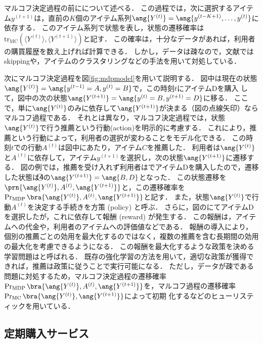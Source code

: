 マルコフ決定過程の前にについて述べる．
この過程では，次に選択するアイテム$y^{(t+1)}$は，直前の$K$個のアイテム系列$\ang{Y^{(t)}}=\ang{y^{(t-K+1)},\dotsc,y^{(t)}}$に依存する．
このアイテム系列で状態を表し，状態の遷移確率は$\mathrm{tr}_\mathrm{MC}(\langle Y^{(t)}\rangle,\langle Y^{(t+1)}\rangle)$と記す．
この確率は，十分なデータがあれば，利用者の購買履歴を数え上げれば計算できる．
しかし，データは疎なので，文献\cite{uai:02:02,jmlr:05:03}ではskippingや，アイテムのクラスタリングなどの手法を用いて対処している．

次にマルコフ決定過程を図\ref{fig:mdpmodel}を用いて説明する．
図中は現在の状態$\ang{Y^{(t)}}=\ang{y^{(t-1)}=A,y^{(t)}=B}$で，この時刻$t$にアイテムDを購入
して，図中の次の状態$\ang{Y^{(t+1)}}=\ang{y^{(t)}=B,y^{(t+1)}=D}$に移る．
ここで，単に$\ang{Y^{(t)}}$のみに依存して$\ang{Y^{(t+1)}}$が決まる（図の点線矢印）ならマルコフ過程である．
それとは異なり，マルコフ決定過程では，状態$\ang{Y^{(t)}}$で行う推薦という行動(action)を明示的に考慮する．
これにより，推薦という行動によって，利用者の選択が変わることをモデル化できる．
この時刻$t$での行動$A^{(t)}$は図中にあたり，アイテム$C$を推薦した．
利用者は$\ang{Y^{(t)}}$と$A^{(t)}$に依存して，アイテム$y^{(t+1)}$を選択し，次の状態$\ang{Y^{(t+1)}}$に遷移する．
図の例では，推薦を受け入れず利用者はでアイテムDを購入したので，遷移した状態は\textcircled{\small 4}の$\ang{Y^{(t+1)}}=\ang{B,D}$となった．
この状態遷移を$\prn{\ang{Y^{(t)}},A^{(t)},\ang{Y^{(t+1)}}}$と，この遷移確率を$\Pr_\mathrm{MDP}\bra{\ang{Y^{(t)}},A^{(t)},\ang{Y^{(t+1)}}}$と記す．
また，状態$\ang{Y^{(t)}}$で行動$A^{(t)}$を決定する手続きを方策 (policy) と呼ぶ．
さらに，図のにてアイテムDを選択したが，これに依存して報酬 (reward) が発生する．
この報酬は，アイテムへの代金や，利用者のアイテムへの評価値などである．
報酬の導入により，個別の推薦ごとの効用を最大化するのではなく，複数の推薦を含む長期間の効用の最大化を考慮できるようになる．
この報酬を最大化するような政策を決める学習問題は\cite{eb:058:00,jb:019:00}と呼ばれる．
既存の強化学習の方法を用いて，適切な政策が獲得できれば，推薦は政策に従うことで実行可能になる．
ただし，データが疎である問題に対処するため，マルコフ決定過程の遷移確率$\Pr_\mathrm{MDP}\bra{\ang{Y^{(t)}}, A^{(t)},\ang{Y^{(t+1)}}}$を，マルコフ過程の遷移確率$\Pr_\mathrm{MC}\bra{\ang{Y^{(t)}}, \ang{Y^{(t+1)}}}$によって初期
化するなどのヒューリスティックを用いている．

\subsection{定期購入サービス}

